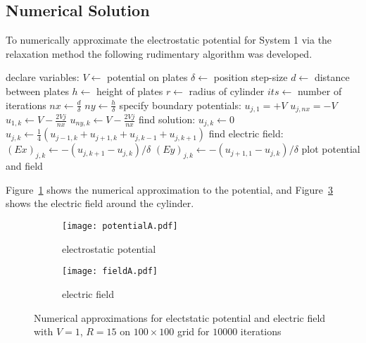 \documentclass[12pt, a4paper]{article}
\begin{document}
\subsection{Numerical Solution}

To numerically approximate the electrostatic potential for System 1 via the 
relaxation method the following rudimentary algorithm was developed.

\begin{algorithm}
\begin{algorithmic}[1]
\State declare variables:
\State $V \gets$ potential on plates
\State $\delta \gets$ position step-size
\State $d \gets$ distance between plates
\State $h \gets$ height of plates
\State $r \gets$ radius of cylinder
\State $its \gets$ number of iterations
\State $nx \gets \frac{d}{\delta}$ 
\State $ny \gets \frac{h}{\delta}$ 
\State specify boundary potentials:
   \State $u_{j, 1} = +V$
   \State $u_{j, nx} = -V$
\EndFor
{}
   \State $u_{1, k} \gets V-\frac{2Vj}{nx}$
   \State $u_{ny, k} \gets V-\frac{2Vj}{nx}$
\EndFor
\State find solution:
            \State $u_{j, k} \gets 0$
         \Else
            \State $u_{j,k} \gets \frac{1}{4}(u_{j-1,k}+u_{j+1,k}+u_{j,k-1}+u_{j,k+1})$
         \EndIf
      \EndFor
   \EndFor
\EndFor
\State find electric field:
      \State $(Ex)_{j, k} \gets -\left(u_{j,k+1}-u_{j,k}\right)/\delta$
      \State $(Ey)_{j,k} \gets -\left(u_{j+1,1}-u_{j,k}\right)/\delta$
   \EndFor
\EndFor
\State plot potential and field
\EndProcedure
\end{algorithmic}
\end{algorithm}

Figure~\ref{fig:numerical} shows the numerical approximation to the potential,
and Figure~\ref{fig:field} shows the electric field around the cylinder.

\begin{figure}
\centering
\begin{subfigure}[b]{0.7\textwidth}
	\texttt{[image: potentialA.pdf]}
	\caption{electrostatic potential}
	\label{fig:numerical}
\end{subfigure}

\begin{subfigure}[b]{0.7\textwidth}
	\texttt{[image: fieldA.pdf]}
	\caption{electric field}
	\label{fig:field}
\end{subfigure}
\caption{Numerical approximations for electstatic potential and electric field with
$V=1$, $R=15$ on $100\times100$ grid for $10000$ iterations}
\end{figure}
\end{document}
